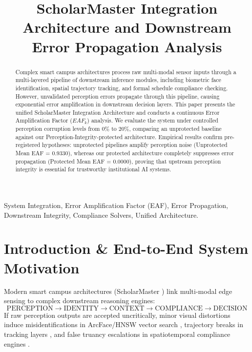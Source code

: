 \documentclass[conference]{IEEEtran}
\begin{document}
\title{ScholarMaster Integration Architecture and Downstream Error Propagation Analysis}

\author{
}

\maketitle

\begin{abstract}
Complex smart campus architectures process raw multi-modal sensor inputs through a multi-layered pipeline of downstream inference modules, including biometric face identification, spatial trajectory tracking, and formal schedule compliance checking. However, unvalidated perception errors propagate through this pipeline, causing exponential error amplification in downstream decision layers. This paper presents the unified ScholarMaster Integration Architecture and conducts a continuous Error Amplification Factor ($EAF_k$) analysis. We evaluate the system under controlled perception corruption levels from 0\% to 20\%, comparing an unprotected baseline against our Perception-Integrity-protected architecture. Empirical results confirm pre-registered hypotheses: unprotected pipelines amplify perception noise (Unprotected Mean EAF = 0.9330), whereas our protected architecture completely suppresses error propagation (Protected Mean EAF = 0.0000), proving that upstream perception integrity is essential for trustworthy institutional AI systems.
\end{abstract}

\begin{IEEEkeywords}
System Integration, Error Amplification Factor (EAF), Error Propagation, Downstream Integrity, Compliance Solvers, Unified Architecture.
\end{IEEEkeywords}

\section{Introduction & End-to-End System Motivation}
Modern smart campus architectures (ScholarMaster \cite{b1}) link multi-modal edge sensing to complex downstream reasoning engines:
\begin{equation}
\text{PERCEPTION} \longrightarrow \text{IDENTITY} \longrightarrow \text{CONTEXT} \longrightarrow \text{COMPLIANCE} \longrightarrow \text{DECISION}
\end{equation}
If raw perception outputs are accepted uncritically, minor visual distortions induce misidentifications in ArcFace/HNSW vector search \cite{b2, b3}, trajectory breaks in tracking layers \cite{b4}, and false truancy escalations in spatiotemporal compliance engines \cite{b5}.
\end{document}
